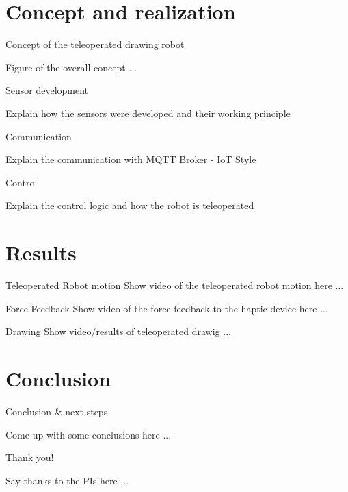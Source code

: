 \documentclass[
xcolor=dvipsnames,
aspectratio=169,
9pt,
]{beamer}
\begin{document}

\section{Concept and realization}

\begin{frame}{Concept of the teleoperated drawing robot}
	
	Figure of the overall concept ...
	
\end{frame}


\begin{frame}{Sensor development}

	Explain how the sensors were developed and their working principle
	
\end{frame}



\begin{frame}{Communication}

	Explain the communication with MQTT Broker - IoT Style

\end{frame}

\begin{frame}{Control}

	Explain the control logic and how the robot is teleoperated

\end{frame}


\section{Results}

\begin{frame}{Teleoperated Robot motion}
	Show video of the teleoperated robot motion here ...
\end{frame}

\begin{frame}{Force Feedback}
	Show video of the force feedback to the haptic device here ...
\end{frame}

\begin{frame}{Drawing}
	Show video/results of teleoperated drawig ...
\end{frame} 


\section{Conclusion}

\begin{frame}{Conclusion \& next steps}

	Come up with some conclusions here ...

\end{frame}


\begin{frame}{Thank you!}
	
	Say thanks to the PIs here ...
	
\end{frame}
\end{document}
